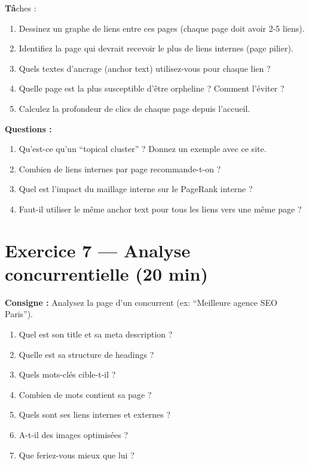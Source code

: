 \documentclass[12pt,a4paper]{report}
\begin{document}
\textbf{T\^a}ches :
\begin{enumerate}
    \item Dessinez un graphe de liens entre ces pages (chaque page doit avoir 2-5 liens).
    \item Identifiez la page qui devrait recevoir le plus de liens internes (page pilier).
    \item Quels textes d'ancrage (anchor text) utilisez-vous pour chaque lien ?
    \item Quelle page est la plus susceptible d'\^{e}tre orpheline ? Comment l'\'{e}viter ?
    \item Calculez la profondeur de clics de chaque page depuis l'accueil.
\end{enumerate}

\textbf{Questions :}
\begin{enumerate}
    \item Qu'est-ce qu'un ``topical cluster'' ? Donnez un exemple avec ce site.
    \item Combien de liens internes par page recommande-t-on ?
    \item Quel est l'impact du maillage interne sur le PageRank interne ?
    \item Faut-il utiliser le m\^{e}me anchor text pour tous les liens vers une m\^{e}me page ?
\end{enumerate}

\section{Exercice 7 --- Analyse concurrentielle (20 min)}

\textbf{Consigne :} Analysez la page d'un concurrent (ex: ``Meilleure agence SEO Paris'').

\begin{enumerate}
    \item Quel est son title et sa meta description ?
    \item Quelle est sa structure de headings ?
    \item Quels mots-cl\'{e}s cible-t-il ?
    \item Combien de mots contient sa page ?
    \item Quels sont ses liens internes et externes ?
    \item A-t-il des images optimis\'{e}es ?
    \item Que feriez-vous mieux que lui ?
\end{enumerate}
\end{document}
